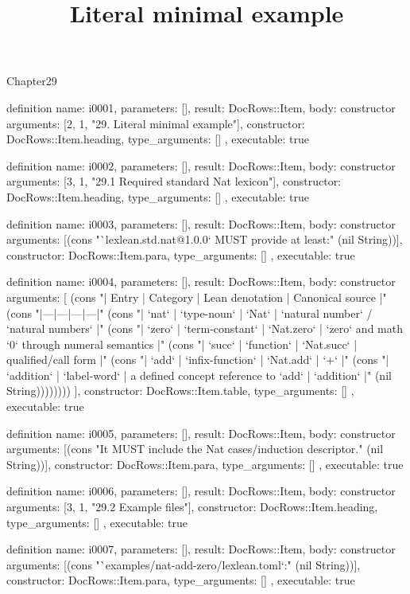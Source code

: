 \begin{lexlean}{Chapter29}
\title{Literal minimal example}
\begin{semanticmodule}
definition{
  name: i0001,
  parameters: [],
  result: DocRows::Item,
  body: constructor{
    arguments: [2, 1, "29. Literal minimal example"],
    constructor: DocRows::Item.heading,
    type_arguments: []
  },
  executable: true
}

definition{
  name: i0002,
  parameters: [],
  result: DocRows::Item,
  body: constructor{
    arguments: [3, 1, "29.1 Required standard Nat lexicon"],
    constructor: DocRows::Item.heading,
    type_arguments: []
  },
  executable: true
}

definition{
  name: i0003,
  parameters: [],
  result: DocRows::Item,
  body: constructor{
    arguments: [(cons "`lexlean.std.nat@1.0.0` MUST provide at least:" (nil String))],
    constructor: DocRows::Item.para,
    type_arguments: []
  },
  executable: true
}

definition{
  name: i0004,
  parameters: [],
  result: DocRows::Item,
  body: constructor{
    arguments: [
      (cons "| Entry | Category | Lean denotation | Canonical source |" (cons "|---|---|---|---|" (cons "| `nat` | `type-noun` | `Nat` | `natural number` / `natural numbers` |" (cons "| `zero` | `term-constant` | `Nat.zero` | `zero` and math `0` through numeral semantics |" (cons "| `succ` | `function` | `Nat.succ` | qualified/call form |" (cons "| `add` | `infix-function` | `Nat.add` | `+` |" (cons "| `addition` | `label-word` | a defined concept reference to `add` | `addition` |" (nil String))))))))
    ],
    constructor: DocRows::Item.table,
    type_arguments: []
  },
  executable: true
}

definition{
  name: i0005,
  parameters: [],
  result: DocRows::Item,
  body: constructor{
    arguments: [(cons "It MUST include the Nat cases/induction descriptor." (nil String))],
    constructor: DocRows::Item.para,
    type_arguments: []
  },
  executable: true
}

definition{
  name: i0006,
  parameters: [],
  result: DocRows::Item,
  body: constructor{
    arguments: [3, 1, "29.2 Example files"],
    constructor: DocRows::Item.heading,
    type_arguments: []
  },
  executable: true
}

definition{
  name: i0007,
  parameters: [],
  result: DocRows::Item,
  body: constructor{
    arguments: [(cons "`examples/nat-add-zero/lexlean.toml`:" (nil String))],
    constructor: DocRows::Item.para,
    type_arguments: []
  },
  executable: true
}


\end{semanticmodule}
\end{lexlean}
